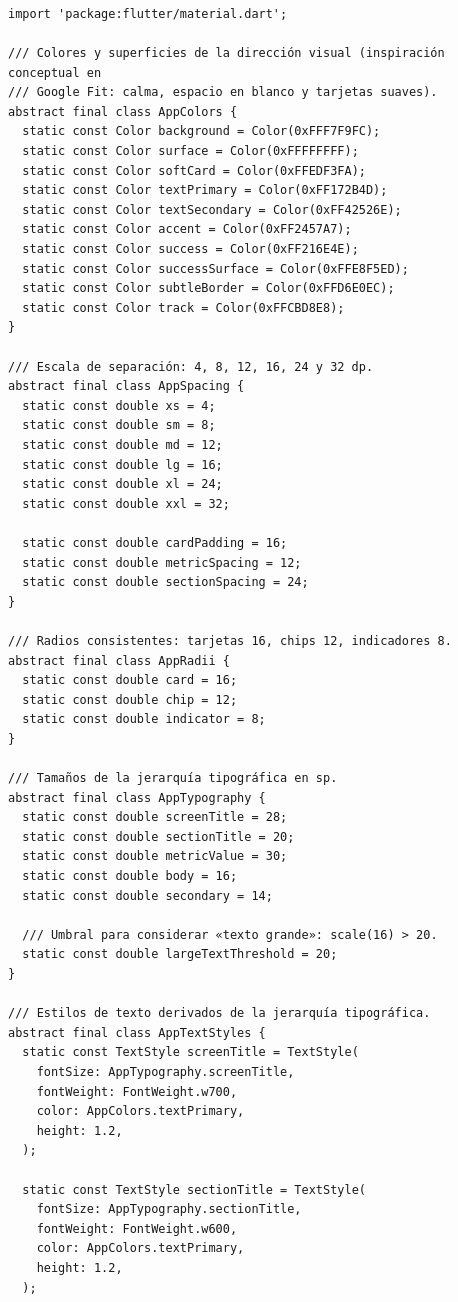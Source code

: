 \documentclass[12pt,a4paper]{article}
\newcommand{\codigo}[1]{\texttt{\detokenize{#1}}}
\begin{document}
\subsubsection*{\codigo{lib/utils/app_constants.dart}}
\begin{lstlisting}
import 'package:flutter/material.dart';

/// Colores y superficies de la dirección visual (inspiración conceptual en
/// Google Fit: calma, espacio en blanco y tarjetas suaves).
abstract final class AppColors {
  static const Color background = Color(0xFFF7F9FC);
  static const Color surface = Color(0xFFFFFFFF);
  static const Color softCard = Color(0xFFEDF3FA);
  static const Color textPrimary = Color(0xFF172B4D);
  static const Color textSecondary = Color(0xFF42526E);
  static const Color accent = Color(0xFF2457A7);
  static const Color success = Color(0xFF216E4E);
  static const Color successSurface = Color(0xFFE8F5ED);
  static const Color subtleBorder = Color(0xFFD6E0EC);
  static const Color track = Color(0xFFCBD8E8);
}

/// Escala de separación: 4, 8, 12, 16, 24 y 32 dp.
abstract final class AppSpacing {
  static const double xs = 4;
  static const double sm = 8;
  static const double md = 12;
  static const double lg = 16;
  static const double xl = 24;
  static const double xxl = 32;

  static const double cardPadding = 16;
  static const double metricSpacing = 12;
  static const double sectionSpacing = 24;
}

/// Radios consistentes: tarjetas 16, chips 12, indicadores 8.
abstract final class AppRadii {
  static const double card = 16;
  static const double chip = 12;
  static const double indicator = 8;
}

/// Tamaños de la jerarquía tipográfica en sp.
abstract final class AppTypography {
  static const double screenTitle = 28;
  static const double sectionTitle = 20;
  static const double metricValue = 30;
  static const double body = 16;
  static const double secondary = 14;

  /// Umbral para considerar «texto grande»: scale(16) > 20.
  static const double largeTextThreshold = 20;
}

/// Estilos de texto derivados de la jerarquía tipográfica.
abstract final class AppTextStyles {
  static const TextStyle screenTitle = TextStyle(
    fontSize: AppTypography.screenTitle,
    fontWeight: FontWeight.w700,
    color: AppColors.textPrimary,
    height: 1.2,
  );

  static const TextStyle sectionTitle = TextStyle(
    fontSize: AppTypography.sectionTitle,
    fontWeight: FontWeight.w600,
    color: AppColors.textPrimary,
    height: 1.2,
  );


\end{lstlisting}
\end{document}
